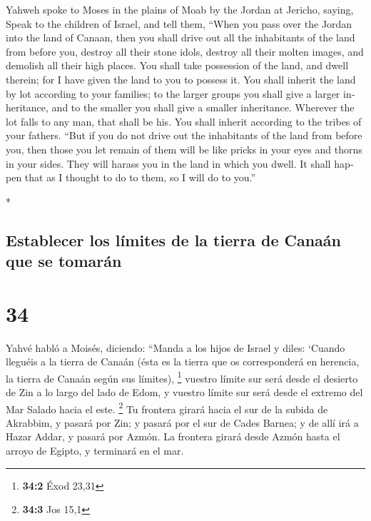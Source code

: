 \begin{paracol}{2}
\begin{otherlanguage}{english}
 Yahweh spoke to Moses in the plains of Moab by the
Jordan at Jericho, saying,  Speak to the children of
Israel, and tell them, ``When you pass over the Jordan into the land of
Canaan,  then you shall drive out all the inhabitants of
the land from before you, destroy all their stone idols, destroy all
their molten images, and demolish all their high places. 
You shall take possession of the land, and dwell therein; for I have
given the land to you to possess it.  You shall inherit
the land by lot according to your families; to the larger groups you
shall give a larger inheritance, and to the smaller you shall give a
smaller inheritance. Wherever the lot falls to any man, that shall be
his. You shall inherit according to the tribes of your fathers.
 ``But if you do not drive out the inhabitants of the
land from before you, then those you let remain of them will be like
pricks in your eyes and thorns in your sides. They will harass you in
the land in which you dwell.  It shall happen that as I
thought to do to them, so I will do to you.''

\end{otherlanguage}

\switchcolumn[0]*

\hypertarget{establecer-los-luxedmites-de-la-tierra-de-canauxe1n-que-se-tomaruxe1n}{%
\subsection{Establecer los límites de la tierra de Canaán que se
tomarán}\label{establecer-los-luxedmites-de-la-tierra-de-canauxe1n-que-se-tomaruxe1n}}

\hypertarget{section-66}{%
\section{34}\label{section-66}}

 Yahvé habló a Moisés, diciendo:  ``Manda a
los hijos de Israel y diles: `Cuando lleguéis a la tierra de Canaán
(ésta es la tierra que os corresponderá en herencia, la tierra de Canaán
según sus límites), \footnote{\textbf{34:2} Éxod 23,31} 
vuestro límite sur será desde el desierto de Zin a lo largo del lado de
Edom, y vuestro límite sur será desde el extremo del Mar Salado hacia el
este. \footnote{\textbf{34:3} Jos 15,1}  Tu frontera
girará hacia el sur de la subida de Akrabbim, y pasará por Zin; y pasará
por el sur de Cades Barnea; y de allí irá a Hazar Addar, y pasará por
Azmón.  La frontera girará desde Azmón hasta el arroyo de
Egipto, y terminará en el mar.


\end{paracol}
